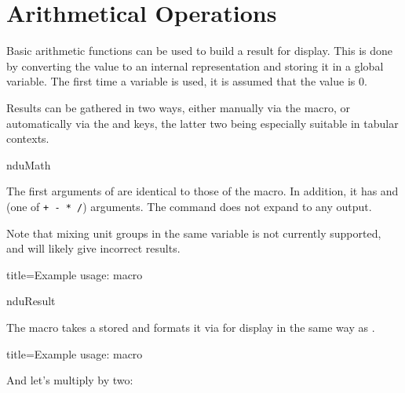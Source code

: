 \documentclass[
	a4paper,
]{article}
\begin{document}
\clearpage
\section{Arithmetical Operations} %

Basic arithmetic functions can be used to build a result for display. This is done by converting the value to an internal representation and storing it in a global variable. The first time a variable is used, it is assumed that the value is 0.

Results can be gathered in two ways, either manually via the  macro, or automatically via the  and  keys, the latter two being especially suitable in tabular contexts.

\begin{docCommand}
	{nduMath}
	{}

	The first arguments of  are identical to those of the  macro. In addition, it has  and  (one of \texttt{+ - * /}) arguments. The command does not expand to any output.

	Note that mixing unit groups in the same variable is not currently supported, and will likely give incorrect results.

\begin{dispExample*}{
	title=Example usage:  macro
}
\end{dispExample*}

\end{docCommand}

\begin{docCommand}
	{nduResult}
	{}

	The  macro takes a stored  and formats it via  for display in the same way as .

\begin{dispExample*}{
	title=Example usage:  macro
}

And let's multiply by two:
\end{dispExample*}

\end{docCommand}
\end{document}
